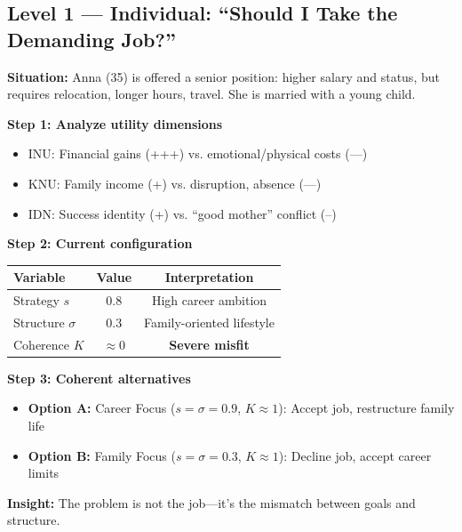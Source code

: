 \subsection{Level 1 — Individual: ``Should I Take the Demanding Job?''}

\begin{tcolorbox}[colback=orange!5!white, colframe=orange!75!black,
    title=\textbf{Worked Example L=1: Career Decision}]

\textbf{Situation:} Anna (35) is offered a senior position: higher salary and status,
but requires relocation, longer hours, travel. She is married with a young child.

\textbf{Step 1: Analyze utility dimensions}
\begin{itemize}[nosep]
  \item INU: Financial gains (+++) vs. emotional/physical costs (---)
  \item KNU: Family income (+) vs. disruption, absence (---)
  \item IDN: Success identity (+) vs. ``good mother'' conflict (--)
\end{itemize}

\textbf{Step 2: Current configuration}
\begin{center}
\begin{tabular}{@{}lcc@{}}
Variable & Value & Interpretation \\
\hline
Strategy $s$ & 0.8 & High career ambition \\
Structure $\sigma$ & 0.3 & Family-oriented lifestyle \\
Coherence $K$ & $\approx 0$ & \textbf{Severe misfit} \\
\end{tabular}
\end{center}

\textbf{Step 3: Coherent alternatives}
\begin{itemize}[nosep]
  \item \textbf{Option A:} Career Focus ($s=\sigma=0.9$, $K \approx 1$): Accept job, restructure family life
  \item \textbf{Option B:} Family Focus ($s=\sigma=0.3$, $K \approx 1$): Decline job, accept career limits
\end{itemize}

\textbf{Insight:} The problem is not the job—it's the mismatch between goals and structure.

\end{tcolorbox}

